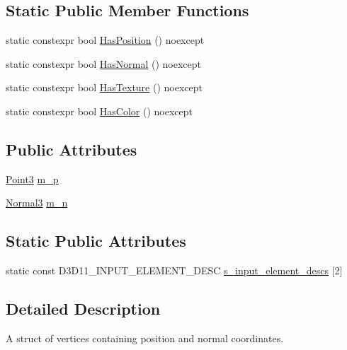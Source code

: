 \subsection*{Static Public Member Functions}
\begin{DoxyCompactItemize}
\item 
static constexpr bool \mbox{\hyperlink{structmage_1_1rendering_1_1_vertex_position_normal_a90efd74233b76b071a322d737caf3abf}{Has\+Position}} () noexcept
\item 
static constexpr bool \mbox{\hyperlink{structmage_1_1rendering_1_1_vertex_position_normal_af5a32a3e51ce13c36b665f83f40209b6}{Has\+Normal}} () noexcept
\item 
static constexpr bool \mbox{\hyperlink{structmage_1_1rendering_1_1_vertex_position_normal_a40b091a64d0b5b2c2a07b382cd546589}{Has\+Texture}} () noexcept
\item 
static constexpr bool \mbox{\hyperlink{structmage_1_1rendering_1_1_vertex_position_normal_aead42377c86418475bb7b4c93398cd34}{Has\+Color}} () noexcept
\end{DoxyCompactItemize}
\subsection*{Public Attributes}
\begin{DoxyCompactItemize}
\item 
\mbox{\hyperlink{structmage_1_1_point3}{Point3}} \mbox{\hyperlink{structmage_1_1rendering_1_1_vertex_position_normal_a14824f61c8740e3472fccff1e3678515}{m\+\_\+p}}
\item 
\mbox{\hyperlink{structmage_1_1_normal3}{Normal3}} \mbox{\hyperlink{structmage_1_1rendering_1_1_vertex_position_normal_a5955e74eca6ef6c7516e6664370f8598}{m\+\_\+n}}
\end{DoxyCompactItemize}
\subsection*{Static Public Attributes}
\begin{DoxyCompactItemize}
\item 
static const D3\+D11\+\_\+\+I\+N\+P\+U\+T\+\_\+\+E\+L\+E\+M\+E\+N\+T\+\_\+\+D\+E\+SC \mbox{\hyperlink{structmage_1_1rendering_1_1_vertex_position_normal_aa8d64953c3186e90eef7a5120c601788}{s\+\_\+input\+\_\+element\+\_\+descs}} \mbox{[}2\mbox{]}
\end{DoxyCompactItemize}


\subsection{Detailed Description}
A struct of vertices containing position and normal coordinates. 

